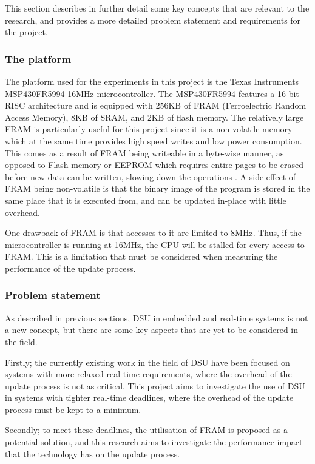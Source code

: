 This section describes in further detail some key concepts that are relevant to the research, and provides a more detailed problem statement and requirements for the project.

\subsubsection*{The platform}\label{sec:platform}
The platform used for the experiments in this project is the Texas Instruments MSP430FR5994 16MHz microcontroller. The MSP430FR5994 features a 16-bit RISC architecture and is equipped with 256KB of FRAM (Ferroelectric Random Access Memory), 8KB of SRAM, and 2KB of flash memory. The relatively large FRAM is particularly useful for this project since it is a non-volatile memory which at the same time provides high speed writes and low power consumption. This comes as a result of FRAM being writeable in a byte-wise manner, as opposed to Flash memory or EEPROM which requires entire pages to be erased before new data can be written, slowing down the operations \cite{framReport}. A side-effect of FRAM being non-volatile is that the binary image of the program is stored in the same place that it is executed from, and can be updated in-place with little overhead. 

One drawback of FRAM is that accesses to it are limited to 8MHz. Thus, if the microcontroller is running at 16MHz, the CPU will be stalled for every access to FRAM. This is a limitation that must be considered when measuring the performance of the update process.


\subsubsection*{Problem statement}
As described in previous sections, DSU in embedded and real-time systems is not a new concept, but there are some key aspects that are yet to be considered in the field. 

Firstly; the currently existing work in the field of DSU have been focused on systems with more relaxed real-time requirements, where the overhead of the update process is not as critical. This project aims to investigate the use of DSU in systems with tighter real-time deadlines, where the overhead of the update process must be kept to a minimum.

Secondly; to meet these deadlines, the utilisation of FRAM is proposed as a potential solution, and this research aims to investigate the performance impact that the technology has on the update process.  

